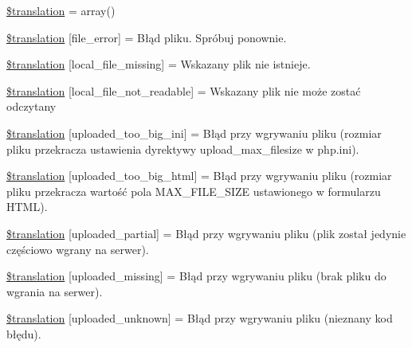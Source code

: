 \begin{DoxyCompactItemize}
\item 
\hyperlink{class_8upload_8pl___p_l_8php_a1f198d410fecc3871ebdd468d343a5e3}{\$translation} = array()
\item 
\hyperlink{class_8upload_8pl___p_l_8php_ac7498e49b9771b04698029aa61c70821}{\$translation} \mbox{[}\textquotesingle{}file\+\_\+error\textquotesingle{}\mbox{]} = \textquotesingle{}Błąd pliku. Spróbuj ponownie.\textquotesingle{}
\item 
\hyperlink{class_8upload_8pl___p_l_8php_a6ec3d3a47ab70d77e7aa593e82ead10e}{\$translation} \mbox{[}\textquotesingle{}local\+\_\+file\+\_\+missing\textquotesingle{}\mbox{]} = \textquotesingle{}Wskazany plik nie istnieje.\textquotesingle{}
\item 
\hyperlink{class_8upload_8pl___p_l_8php_a60104befef9b241f3a7a6a755618a4b3}{\$translation} \mbox{[}\textquotesingle{}local\+\_\+file\+\_\+not\+\_\+readable\textquotesingle{}\mbox{]} = \textquotesingle{}Wskazany plik nie może zostać odczytany\textquotesingle{}
\item 
\hyperlink{class_8upload_8pl___p_l_8php_a6a08dcd0d3651fdd098568f6b2f0a42c}{\$translation} \mbox{[}\textquotesingle{}uploaded\+\_\+too\+\_\+big\+\_\+ini\textquotesingle{}\mbox{]} = \textquotesingle{}Błąd przy wgrywaniu pliku (rozmiar pliku przekracza ustawienia dyrektywy upload\+\_\+max\+\_\+filesize w php.\+ini).\textquotesingle{}
\item 
\hyperlink{class_8upload_8pl___p_l_8php_a623d5b8b92169f57d7e43458aa911cbb}{\$translation} \mbox{[}\textquotesingle{}uploaded\+\_\+too\+\_\+big\+\_\+html\textquotesingle{}\mbox{]} = \textquotesingle{}Błąd przy wgrywaniu pliku (rozmiar pliku przekracza wartość pola M\+A\+X\+\_\+\+F\+I\+L\+E\+\_\+\+S\+I\+Z\+E ustawionego w formularzu H\+T\+M\+L).\textquotesingle{}
\item 
\hyperlink{class_8upload_8pl___p_l_8php_a967c17da21b0a2d3bd65cca3a9ca0ea8}{\$translation} \mbox{[}\textquotesingle{}uploaded\+\_\+partial\textquotesingle{}\mbox{]} = \textquotesingle{}Błąd przy wgrywaniu pliku (plik został jedynie częściowo wgrany na serwer).\textquotesingle{}
\item 
\hyperlink{class_8upload_8pl___p_l_8php_a0cce433260be65f1f35853a6b4b8952b}{\$translation} \mbox{[}\textquotesingle{}uploaded\+\_\+missing\textquotesingle{}\mbox{]} = \textquotesingle{}Błąd przy wgrywaniu pliku (brak pliku do wgrania na serwer).\textquotesingle{}
\item 
\hyperlink{class_8upload_8pl___p_l_8php_a4a9168e922b827e6a28b5db1c00774ca}{\$translation} \mbox{[}\textquotesingle{}uploaded\+\_\+unknown\textquotesingle{}\mbox{]} = \textquotesingle{}Błąd przy wgrywaniu pliku (nieznany kod błędu).\textquotesingle{}

\end{DoxyCompactItemize}
